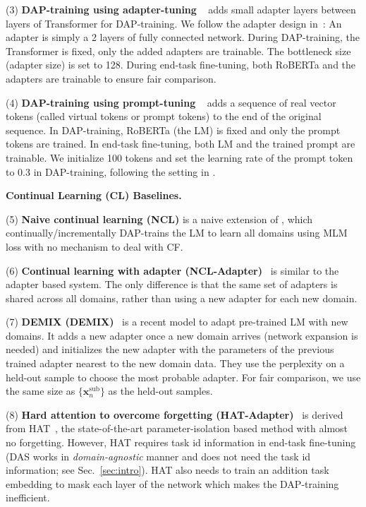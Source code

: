 \documentclass{article} \usepackage{iclr2023_conference,times}
\begin{document}
(3) \textbf{DAP-training using adapter-tuning }~\cite{madotto2020continual,Houlsby2019Parameter} adds small adapter layers between layers of Transformer for DAP-training. We follow the adapter design in~\cite{madotto2020continual,Houlsby2019Parameter}: An adapter is simply a 2 layers of fully connected network. During DAP-training, the Transformer is fixed, only the added adapters are trainable. The bottleneck size (adapter size) is set to 128. 
During end-task fine-tuning, both RoBERTa and the adapters are trainable to ensure fair comparison.


(4) \textbf{DAP-training using prompt-tuning }~\cite{DBLP:conf/emnlp/LesterAC21} adds a sequence of real vector tokens (called virtual tokens or prompt tokens) to the end of the original sequence. In DAP-training, RoBERTa (the LM) is fixed and only the prompt tokens are trained. In end-task fine-tuning, both LM and the trained prompt are trainable. We initialize 100 tokens and set the learning rate of the prompt token to 0.3 in DAP-training, following the setting in \cite{DBLP:conf/emnlp/LesterAC21}. 




\vspace{+2mm}
\noindent
\textbf{Continual Learning (CL) Baselines.}

(5) \textbf{Naive continual learning (NCL)} is a naive extension of \cite{DBLP:conf/acl/GururanganMSLBD20}, which continually/incrementally DAP-trains the LM to learn all domains using MLM loss with no mechanism to deal with CF.

(6) \textbf{Continual learning with adapter (NCL-Adapter)}~\cite{Houlsby2019Parameter} is similar to the adapter based system. The only difference is that the same set of adapters is shared across all domains, rather than using a new adapter for each new domain.

(7) \textbf{DEMIX (DEMIX)}~\cite{gururangan2021demix} is a recent model to adapt pre-trained LM with new domains. It adds a new adapter once a new domain arrives (network expansion is needed) and initializes the new adapter with the parameters of the previous trained adapter nearest to the new domain data. They use the perplexity on a held-out sample to choose the most probable adapter. For fair comparison, we use the same size as $\{\bm{x}^{\text{sub}}_n\}$ as the held-out samples.

(8) \textbf{Hard attention to overcome forgetting (HAT-Adapter)}~\cite{ke2021adapting} is derived from HAT~\cite{Serra2018overcoming}, the state-of-the-art parameter-isolation based method with almost no forgetting. However, HAT requires task id information in end-task fine-tuning (DAS works in \textit{domain-agnostic} manner and does not need the task id information; see Sec.~\ref{sec:intro}). HAT also needs to train an addition task embedding to mask each layer of the network which makes the DAP-training inefficient. 
\end{document}
